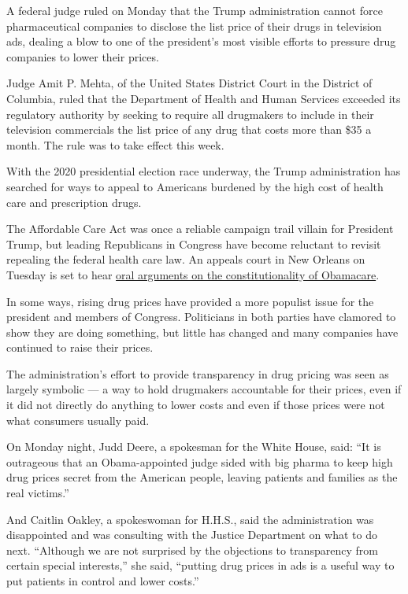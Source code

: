 A federal judge ruled on Monday that the Trump administration cannot
force pharmaceutical companies to disclose the list price of their drugs
in television ads, dealing a blow to one of the president's most visible
efforts to pressure drug companies to lower their prices.

Judge Amit P. Mehta, of the United States District Court in the District
of Columbia, ruled that the Department of Health and Human Services
exceeded its regulatory authority by seeking to require all drugmakers
to include in their television commercials the list price of any drug
that costs more than \$35 a month. The rule was to take effect this
week.

With the 2020 presidential election race underway, the Trump
administration has searched for ways to appeal to Americans burdened by
the high cost of health care and prescription drugs.

The Affordable Care Act was once a reliable campaign trail villain for
President Trump, but leading Republicans in Congress have become
reluctant to revisit repealing the federal health care law. An appeals
court in New Orleans on Tuesday is set to hear
\href{https://www.nytimes3xbfgragh.onion/2019/05/01/health/unconstitutional-trump-aca.html}{oral
arguments on the constitutionality of Obamacare}.

In some ways, rising drug prices have provided a more populist issue for
the president and members of Congress. Politicians in both parties have
clamored to show they are doing something, but little has changed and
many companies have continued to raise their prices.

The administration's effort to provide transparency in drug pricing was
seen as largely symbolic --- a way to hold drugmakers accountable for
their prices, even if it did not directly do anything to lower costs and
even if those prices were not what consumers usually paid.

On Monday night, Judd Deere, a spokesman for the White House, said: ``It
is outrageous that an Obama-appointed judge sided with big pharma to
keep high drug prices secret from the American people, leaving patients
and families as the real victims.''

And Caitlin Oakley, a spokeswoman for H.H.S., said the administration
was disappointed and was consulting with the Justice Department on what
to do next. ``Although we are not surprised by the objections to
transparency from certain special interests,'' she said, ``putting drug
prices in ads is a useful way to put patients in control and lower
costs.''

